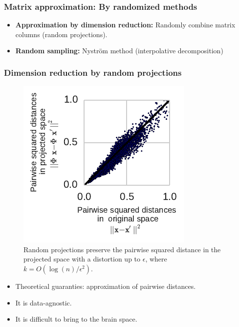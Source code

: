 \documentclass{beamer}
\begin{document}
\begin{frame}\frametitle{\textbf{Matrix approximation:} By randomized methods}

\begin{itemize}
\item \textbf{Approximation by dimension reduction:} Randomly combine matrix 
columns (random projections).
\item \textbf{Random sampling:} Nystr\"om method (interpolative decomposition)
\end{itemize}
\end{frame}


\begin{frame}
\frametitle{\textbf{Dimension reduction by random projections}}

\begin{figure}
\centering
\includegraphics[width=0.4\linewidth]{figures/pairwise_distace.pdf}
\caption{Random projections preserve the pairwise squared distance in the 
projected 
space with a distortion up to $\epsilon$, where $k = O(\log(n)/\epsilon^2).$ }
\end{figure}

\begin{itemize}
\item Theoretical guaranties: approximation of pairwise 
distances.
\item It is data-agnostic.
\item It is difficult to bring to the brain space.
\end{itemize}
\end{frame}
\end{document}
